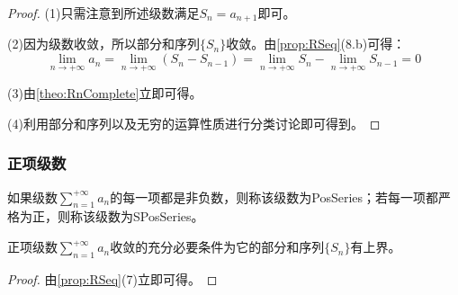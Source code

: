 \begin{proof}
	(1)只需注意到所述级数满足$S_n=a_{n+1}$即可。\par
	(2)因为级数收敛，所以部分和序列$\{S_n\}$收敛。由\cref{prop:RSeq}(8.b)可得：
	\begin{equation*}
		\lim_{n\to+\infty}a_n=\lim_{n\to+\infty}(S_n-S_{n-1})=\lim_{n\to+\infty}S_n-\lim_{n\to+\infty}S_{n-1}=0
	\end{equation*}\par
	(3)由\cref{theo:RnComplete}立即可得。\par
	(4)利用部分和序列以及无穷的运算性质进行分类讨论即可得到。
\end{proof}
\subsubsection{正项级数}
\begin{definition}
	如果级数$\sum\limits_{n=1}^{+\infty}a_n$的每一项都是非负数，则称该级数为\gls{PosSeries}；若每一项都严格为正，则称该级数为\gls{SPosSeries}。
\end{definition}
\begin{property}\label{prop:PositiveSeries}
	正项级数$\sum\limits_{n=1}^{+\infty}a_n$收敛的充分必要条件为它的部分和序列$\{S_n\}$有上界。
\end{property}
\begin{proof}
	由\cref{prop:RSeq}(7)立即可得。
\end{proof}
